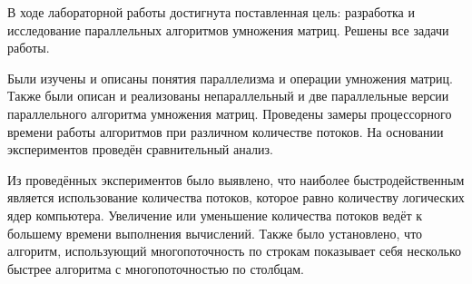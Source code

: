В ходе лабораторной работы достигнута поставленная цель: разработка и исследование параллельных алгоритмов умножения матриц. Решены все задачи работы.

Были изучены и описаны понятия параллелизма и операции умножения матриц. Также были описан и реализованы непараллельный и две параллельные версии параллельного алгоритма умножения матриц. Проведены замеры процессорного времени работы алгоритмов при различном количестве потоков. На основании экспериментов проведён сравнительный анализ.

Из проведённых экспериментов было выявлено, что наиболее быстродейственным является использование количества потоков, которое равно количеству логических ядер компьютера. Увеличение или уменьшение количества потоков ведёт к большему времени выполнения вычислений. Также было установлено, что алгоритм, использующий многопоточность по строкам показывает себя несколько быстрее алгоритма с многопоточностью по столбцам.